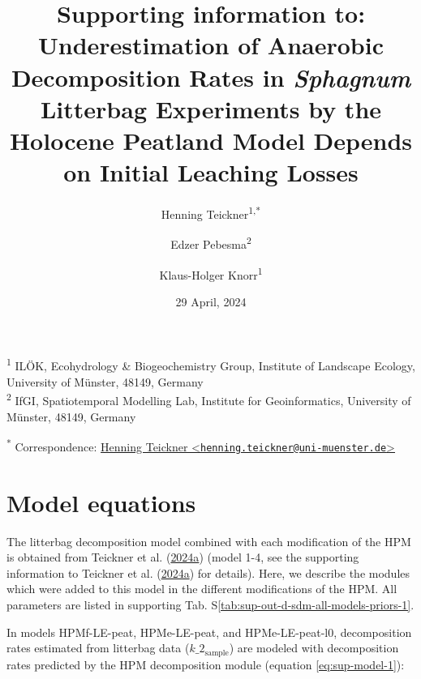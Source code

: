 \documentclass[
  12pt,
]{article}
\title{Supporting information to: Underestimation of Anaerobic Decomposition Rates in \emph{Sphagnum} Litterbag Experiments by the Holocene Peatland Model Depends on Initial Leaching Losses}
\author{Henning Teickner\textsuperscript{1,*} \and Edzer Pebesma\textsuperscript{2} \and Klaus-Holger Knorr\textsuperscript{1}}
\date{29 April, 2024}
\begin{document}
\maketitle

{
\setcounter{tocdepth}{2}
\tableofcontents
}
\textsuperscript{1} ILÖK, Ecohydrology \& Biogeochemistry Group, Institute of Landscape Ecology, University of Münster, 48149, Germany\\
\textsuperscript{2} IfGI, Spatiotemporal Modelling Lab, Institute for Geoinformatics, University of Münster, 48149, Germany

\textsuperscript{*} Correspondence: \href{mailto:henning.teickner@uni-muenster.de}{Henning Teickner \textless{}\href{mailto:henning.teickner@uni-muenster.de}{\nolinkurl{henning.teickner@uni-muenster.de}}\textgreater{}}

\hypertarget{sup-1}{%
\section{Model equations}\label{sup-1}}

The litterbag decomposition model combined with each modification of the HPM is obtained from Teickner et al. (\protect\hyperlink{ref-Teickner.2024}{2024a}) (model 1-4, see the supporting information to Teickner et al. (\protect\hyperlink{ref-Teickner.2024}{2024a}) for details). Here, we describe the modules which were added to this model in the different modifications of the HPM. All parameters are listed in supporting Tab. S\ref{tab:sup-out-d-sdm-all-models-priors-1}.

In models HPMf-LE-peat, HPMe-LE-peat, and HPMe-LE-peat-l0, decomposition rates estimated from litterbag data (\(k\_2_{\text{sample}}\)) are modeled with decomposition rates predicted by the HPM decomposition module (equation \eqref{eq:sup-model-1}):
\end{document}
